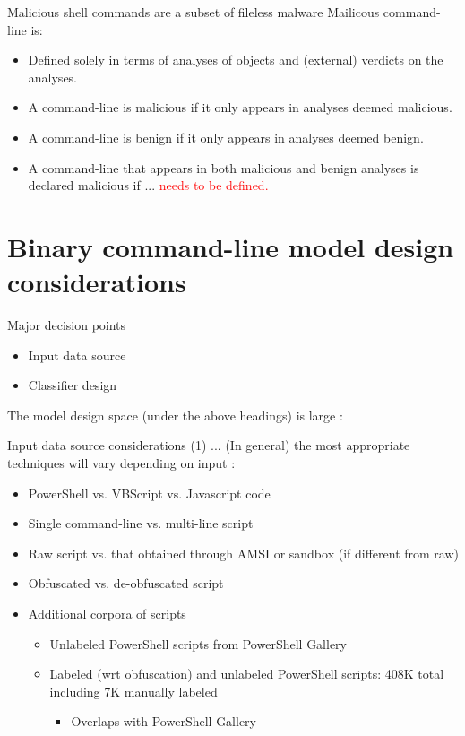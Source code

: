 \documentclass[10pt]{beamer}
\begin{document}
\begin{frame}{Malicious shell commands are a subset of fileless malware}
	Mailicous command-line is:
	\begin{itemize}
		\item Defined solely in terms of analyses of objects and (external) verdicts on the analyses.
		\item A command-line is malicious if it only appears in analyses deemed malicious.
		\item A command-line is benign if it only appears in analyses deemed benign.
		\item A command-line that appears in both malicious and benign analyses is declared malicious if ... \textcolor{red}{needs to be defined.}
	\end{itemize}
\end{frame}

\section{Binary command-line model design considerations}

\begin{frame}[fragile]{Major decision points}
	\begin{itemize}
		\item Input data source
		\item Classifier design
	\end{itemize}

	The model design space (under the above headings) is large \cite{survey2021,msft2017,powershell2018,amsi2019,feye2018,feye2018-2,textcnn2016,textcnn2019,transformers2019}:
\end{frame}

\begin{frame}{Input data source considerations (1) ...}
	(In general) the most appropriate techniques will vary depending on input \cite{msft2017-2,msft2019,feye2018}:
	\begin{itemize}
		\item PowerShell vs. VBScript vs. Javascript code 
		\item Single command-line vs. multi-line script
		\item Raw script vs. that obtained through AMSI or sandbox (if different from raw)
		\item Obfuscated vs. de-obfuscated script
		\item Additional corpora of scripts
		\begin{itemize}
			\item Unlabeled PowerShell scripts from PowerShell Gallery \cite{data1}
			\item Labeled (wrt obfuscation) and unlabeled PowerShell scripts: 408K total including 7K manually labeled \cite{data21,data22}
			\begin {itemize}
				\item Overlaps with PowerShell Gallery
			\end {itemize}
		\end{itemize}
	\end{itemize}
\end{frame}
\end{document}
